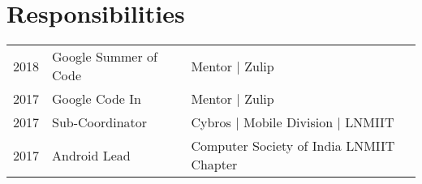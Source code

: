\documentclass[a4paper]{deedy-resume} %
\begin{document}
\begin{minipage}[t]{0.66\textwidth}
    \section{Responsibilities} 
    
    \begin{tabular}{rll}
    2018 & Google Summer of Code & Mentor | Zulip\\
    2017 & Google Code In & Mentor | Zulip\\
    2017 & Sub-Coordinator & Cybros | Mobile Division | LNMIIT\\
    2017 & Android Lead & Computer Society of India LNMIIT Chapter\\
    \end{tabular}
    
    \sectionspace %
    
    
    \end{minipage} %
    
    
    
    
    
    
    
    
    
\end{document}
